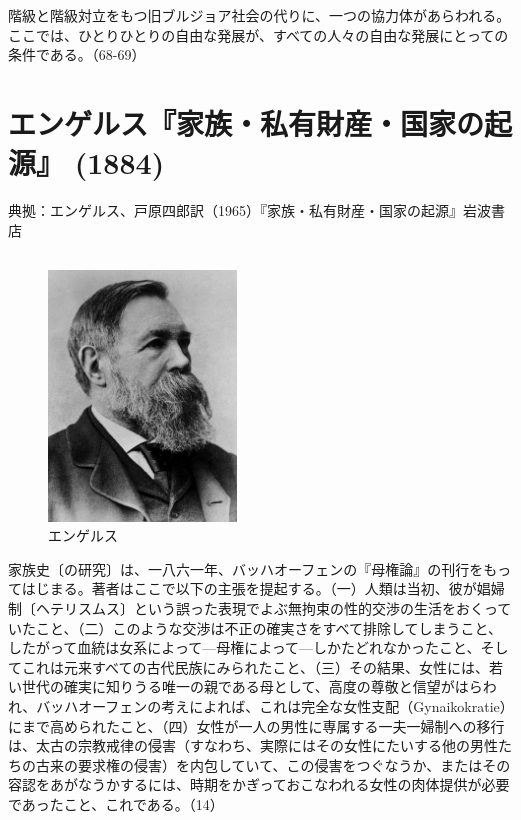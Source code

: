 階級と階級対立をもつ旧ブルジョア社会の代りに、一つの協力体があらわれる。ここでは、ひとりひとりの自由な発展が、すべての人々の自由な発展にとっての条件である。（68-69）


\newpage{}

\section{エンゲルス『家族・私有財産・国家の起源』 (1884)}



典拠：エンゲルス、戸原四郎訳（1965）『家族・私有財産・国家の起源』岩波書店

\subsection*{}




  \begin{figure}[htbp]
    \centering
      \includegraphics[width=50mm]{images/engels.jpg}
      \caption{エンゲルス} 
  \end{figure}


家族史〔の研究〕は、一八六一年、バッハオーフェンの『母権論』の刊行をもってはじまる。著者はここで以下の主張を提起する。（一）人類は当初、彼が娼婦制〔ヘテリスムス〕という誤った表現でよぶ無拘束の性的交渉の生活をおくっていたこと、（二）このような交渉は不正の確実さをすべて排除してしまうこと、したがって血統は女系によって{\——}母権によって{\——}しかたどれなかったこと、そしてこれは元来すべての古代民族にみられたこと、（三）その結果、女性には、若い世代の確実に知りうる唯一の親である母として、高度の尊敬と信望がはらわれ、バッハオーフェンの考えによれば、これは完全な女性支配（Gynaikokratie）にまで高められたこと、（四）女性が一人の男性に専属する一夫一婦制への移行は、太古の宗教戒律の侵害（すなわち、実際にはその女性にたいする他の男性たちの古来の要求権の侵害）を内包していて、この侵害をつぐなうか、またはその容認をあがなうかするには、時期をかぎっておこなわれる女性の肉体提供が必要であったこと、これである。（14）

